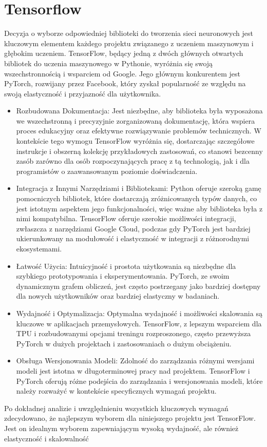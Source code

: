 \documentclass[a4paper,twoside,12pt]{book}
\begin{document}
\section{Tensorflow}

Decyzja o wyborze odpowiedniej biblioteki do tworzenia sieci neuronowych jest kluczowym elementem każdego projektu związanego z uczeniem maszynowym i głębokim uczeniem. TensorFlow, będący jedną z dwóch głównych otwartych bibliotek do uczenia maszynowego w Pythonie, wyróżnia się swoją wszechstronnością i wsparciem od Google. Jego głównym konkurentem jest PyTorch, rozwijany przez Facebook, który zyskał popularność ze względu na swoją elastyczność i przyjazność dla użytkownika.
\begin{itemize}
	\item Rozbudowana Dokumentacja: Jest niezbędne, aby biblioteka była wyposażona we wszechstronną i precyzyjnie zorganizowaną dokumentację, która wspiera proces edukacyjny oraz efektywne rozwiązywanie problemów technicznych. W kontekście tego wymogu TensorFlow wyróżnia się, dostarczając szczegółowe instrukcje i obszerną kolekcję przykładowych zastosowań, co stanowi bezcenny zasób zarówno dla osób rozpoczynających pracę z tą technologią, jak i dla programistów o zaawansowanym poziomie doświadczenia.
	\item Integracja z Innymi Narzędziami i Bibliotekami: Python oferuje szeroką gamę pomocniczych bibliotek, które dostarczają zróżnicowanych typów danych, co jest istotnym aspektem jego funkcjonalności, więc ważne aby biblioteka była z nimi kompatybilna. TensorFlow oferuje szerokie możliwości integracji, zwłaszcza z narzędziami Google Cloud, podczas gdy PyTorch jest bardziej ukierunkowany na modułowość i elastyczność w integracji z różnorodnymi ekosystemami.
	\item Łatwość Użycia: Intuicyjność i prostota użytkowania są niezbędne dla szybkiego prototypowania i eksperymentowania. PyTorch, ze swoim dynamicznym grafem obliczeń, jest często postrzegany jako bardziej dostępny dla nowych użytkowników oraz bardziej elastyczny w badaniach.
	\item Wydajność i Optymalizacja: Optymalna wydajność i możliwości skalowania są kluczowe w aplikacjach przemysłowych. TensorFlow, z lepszym wsparciem dla TPU i rozbudowanymi opcjami treningu rozproszonego, często przewyższa PyTorch w dużych projektach i zastosowaniach o dużym obciążeniu.
	\item Obsługa Wersjonowania Modeli: Zdolność do zarządzania różnymi wersjami modeli jest istotna w długoterminowej pracy nad projektem. TensorFlow i PyTorch oferują różne podejścia do zarządzania i wersjonowania modeli, które należy rozważyć w kontekście specyficznych wymagań projektu.
\end{itemize}
Po dokładnej analizie i uwzględnieniu wszystkich kluczowych wymagań zdecydowano, że najlepszym wyborem dla niniejszego projektu jest TensorFlow. Jest on idealnym wyborem zapewniającym wysoką wydajność, ale również elastyczność i skalowalność
\end{document}
